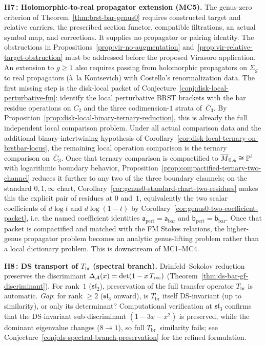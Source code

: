 \begin{remark}
\smallskip\noindent
\textbf{H7\,: Holomorphic-to-real propagator extension (MC5).}
The genus-zero criterion of Theorem~\ref{thm:brst-bar-genus0} requires constructed target and relative carriers, the prescribed section functor, compatible filtrations, an actual symbol map, and corrections.
It supplies no propagator or pairing identity.
The obstructions in Propositions~\ref{prop:vir-no-augmentation} and~\ref{prop:vir-relative-target-obstruction} must be addressed before the proposed Virasoro application.
An extension to $g\geq1$ also requires passing from
holomorphic propagators on $\Sigma_g$ to real propagators
(\`a~la Kontsevich) with Costello's renormalization data.
The first missing step is the disk-local packet of
Conjecture~\ref{conj:disk-local-perturbative-fm}: identify the local
perturbative BRST brackets with the bar residue operations on
$C_2$ and the three codimension-$1$ strata of~$\overline{C}_3$.
By Proposition~\ref{prop:disk-local-binary-ternary-reduction}, this is
already the full independent local comparison problem.
Under all actual comparison data and the additional binary-intertwining hypothesis of Corollary~\ref{cor:disk-local-ternary-on-brstbar-locus}, the remaining local operation comparison is the
ternary comparison on~$\overline{C}_3$.
Once that ternary comparison is compactified to
$\overline{M}_{0,4} \cong \mathbb{P}^1$ with logarithmic boundary behavior,
Proposition~\ref{prop:compactified-ternary-two-channel} reduces it
further to any two of the three boundary channels; on the standard
$0,1,\infty$ chart,
Corollary~\ref{cor:genus0-standard-chart-two-residues} makes this the
explicit pair of residues at $0$ and~$1$, equivalently the two scalar
coefficients of $d\log t$ and $d\log(1-t)$ by
Corollary~\ref{cor:genus0-two-coefficient-packet}, i.e. the named
coefficient identities
\(\mathsf{a}_{\mathrm{pert}}=\mathsf{a}_{\mathrm{bar}}\) and
\(\mathsf{b}_{\mathrm{pert}}=\mathsf{b}_{\mathrm{bar}}\).
Once that packet is compactified and matched with the FM Stokes
relations, the higher-genus propagator problem becomes an analytic
genus-lifting problem rather than a local dictionary problem.
This is downstream of MC1--MC4.

\smallskip\noindent
\textbf{H8\,: DS transport of $T_{\mathrm{br}}$ (spectral branch).}
Drinfeld--Sokolov reduction preserves the discriminant
$\Delta_{\mathcal{A}}(x) = \det(1 - x \, T_{\mathrm{rec}})$
(Theorem~\ref{thm:ds-bar-gf-discriminant}).  For rank~$1$
($\mathfrak{sl}_2$), preservation of the full transfer operator
$T_{\mathrm{br}}$ is automatic.  \emph{Gap}: for rank $\geq 2$
($\mathfrak{sl}_3$ onward), is $T_{\mathrm{br}}$ itself
DS-invariant (up to similarity), or only its determinant?
Computational verification at $\mathfrak{sl}_3$
 confirms that the DS-invariant sub-discriminant
$(1 - 3x - x^2)$ is preserved, while the dominant eigenvalue
changes ($8 \to 1$), so full $T_{\mathrm{br}}$~similarity fails;
see Conjecture~\ref{conj:ds-spectral-branch-preservation}
for the refined formulation.
\end{remark}

